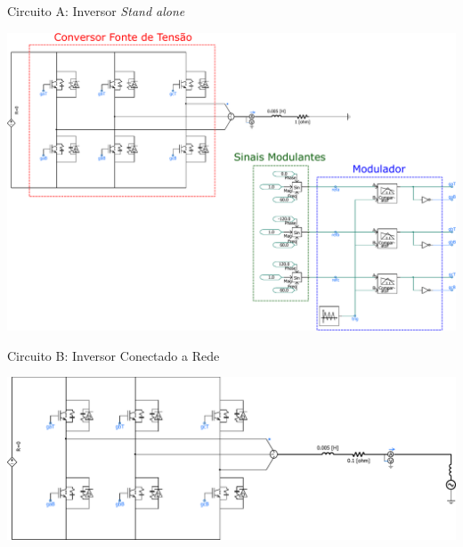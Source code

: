 





\begin{frame}{Circuito A: Inversor {\it Stand alone}}
\centering


\includegraphics[width=0.65\linewidth]{./figuras/Terceiro-Circuito/SIM6a}


\end{frame}








\begin{frame}{Circuito B: Inversor Conectado a Rede}
\centering


\includegraphics[width=0.75\linewidth]{./figuras/Terceiro-Circuito/SIM6b_CIRCUITO}


\end{frame}




